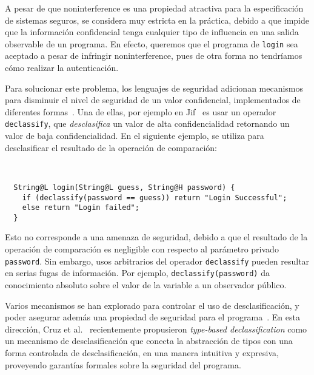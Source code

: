 A pesar de que noninterference es una propiedad atractiva para la especificación de sistemas seguros, se considera muy estricta en la práctica, debido a que impide que la información confidencial tenga cualquier tipo de influencia en una salida observable de un programa. En efecto, queremos que el programa de \texttt{login} sea aceptado a pesar de infringir noninterference, pues de otra forma no tendríamos cómo realizar la autenticación.

Para solucionar este problema, los lenguajes de seguridad adicionan mecanismos para disminuir el nivel de seguridad de un valor confidencial, implementados de diferentes formas~\cite{sabelfeldSands:JCS09}. Una de ellas, por ejemplo en Jif~\cite{jif} es usar un operador \texttt{declassify}, que \emph{desclasifica} un valor de alta confidencialidad retornando un valor de baja confidencialidad. En el siguiente ejemplo, se utiliza para desclasificar el resultado de la operación de comparación:

\begin{ej} \ \\
  \normalfont
  \label{ej2-2}
\begin{lstlisting}
  String@L login(String@L guess, String@H password) {
    if (declassify(password == guess)) return "Login Successful";
    else return "Login failed";
  }
\end{lstlisting}
\end{ej}



Esto no corresponde a una amenaza de seguridad, debido a que el resultado de la operación de comparación es negligible con respecto al parámetro privado \texttt{password}. Sin embargo, usos arbitrarios del operador \texttt{declassify} pueden resultar en serias fugas de información. Por ejemplo, \texttt{declassify(password)} da conocimiento absoluto sobre el valor de la variable a un observador público.

Varios mecanismos se han explorado para controlar el uso de desclasificación, y poder asegurar además una propiedad de seguridad para el programa~\cite{sabelfeldSands:JCS09}. En esta dirección, Cruz et al.~\cite{cruzAl:ecoop2017} recientemente propusieron \emph{type-based declassification} como un mecanismo de desclasificación que conecta la abstracción de tipos con una forma controlada de desclasificación, en una manera intuitiva y expresiva, proveyendo garantías formales sobre la seguridad del programa.

